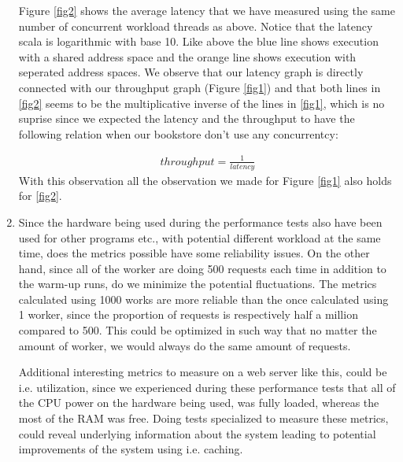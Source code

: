 \documentclass[10pt,a4paper]{article}
\begin{document}
\begin{enumerate}
	Figure \ref{fig2} shows the average latency that we have measured using the same number of concurrent workload threads as above. Notice that the latency scala is logarithmic with base 10. Like above the blue line shows execution with a shared address space and the orange line shows execution with seperated address spaces. We observe that our latency graph is directly connected with our throughput graph (Figure \ref{fig1}) and that both lines in \ref{fig2} seems to be the multiplicative inverse of the lines in \ref{fig1}, which is no suprise since we expected the latency and the throughput to have the following relation when our bookstore don't use any concurrentcy:

	\begin{align*}
		throughput = \frac{1}{latency}
	\end{align*}
	With this observation all the observation we made for Figure \ref{fig1} also holds for \ref{fig2}.

	\item Since the hardware being used during the performance tests also have been used for other programs etc., with potential different workload at the same time, does  the metrics possible have some reliability issues. On the other hand, since all of the worker are doing 500 requests each time in addition to the warm-up runs, do we minimize the potential fluctuations.
	\newline	
	The metrics calculated using 1000 works are more reliable than the once calculated using 1 worker, since the proportion of requests is respectively half a million compared to 500. This could be optimized in such way that no matter the amount of worker, we would always do the same amount of requests.
	\newline
	
	Additional interesting metrics to measure on a web server like this, could be i.e. utilization, since we experienced during these performance tests that all of the CPU power on the hardware being used, was fully loaded, whereas the most of the RAM was free. Doing tests specialized to measure these metrics, could reveal underlying information about the system leading to potential improvements of the system using i.e. caching.


\end{enumerate}
\end{document}
